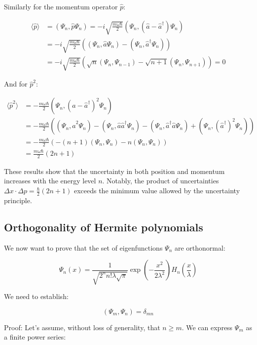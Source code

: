 \documentclass[italian]{HKNdocument}
\begin{document}
Similarly for the momentum operator $\hat{p}$:

\begin{align}
\langle\hat{p}\rangle &= (\Psi_n, \hat{p}\Psi_n) = -i\sqrt{\frac{m\omega\hbar}{2}}(\Psi_n, (\hat{a}-\hat{a}^\dagger)\Psi_n) \\
&= -i\sqrt{\frac{m\omega\hbar}{2}}((\Psi_n, \hat{a}\Psi_n) - (\Psi_n, \hat{a}^\dagger\Psi_n)) \\
&= -i\sqrt{\frac{m\omega\hbar}{2}}(\sqrt{n}(\Psi_n, \Psi_{n-1}) - \sqrt{n+1}(\Psi_n, \Psi_{n+1})) = 0
\end{align}

And for $\hat{p}^2$:

\begin{align}
\langle\hat{p}^2\rangle &= -\frac{m\omega\hbar}{2}(\Psi_n, (\hat{a}-\hat{a}^\dagger)^2\Psi_n) \\
&= -\frac{m\omega\hbar}{2}((\Psi_n, \hat{a}^2\Psi_n) - (\Psi_n, \hat{a}\hat{a}^\dagger\Psi_n) - (\Psi_n, \hat{a}^\dagger\hat{a}\Psi_n) + (\Psi_n, (\hat{a}^\dagger)^2\Psi_n)) \\
&= -\frac{m\omega\hbar}{2}(-(n+1)(\Psi_n, \Psi_n) - n(\Psi_n, \Psi_n)) \\
&= \frac{m\omega\hbar}{2}(2n+1)
\end{align}

These results show that the uncertainty in both position and momentum increases with the energy level $n$. Notably, the product of uncertainties $\Delta x \cdot \Delta p = \frac{\hbar}{2}(2n+1)$ exceeds the minimum value allowed by the uncertainty principle.

\subsection{Orthogonality of Hermite polynomials}

We now want to prove that the set of eigenfunctions $\Psi_n$ are orthonormal:

\begin{equation}
\Psi_n(x) = \frac{1}{\sqrt{2^n n!\lambda\sqrt{\pi}}}\exp\left(-\frac{x^2}{2\lambda^2}\right)H_n\left(\frac{x}{\lambda}\right)
\end{equation}

We need to establish:

\begin{equation}
(\Psi_m, \Psi_n) = \delta_{mn}
\end{equation}

Proof: Let's assume, without loss of generality, that $n \geq m$. We can express $\Psi_m$ as a finite power series:
\end{document}
